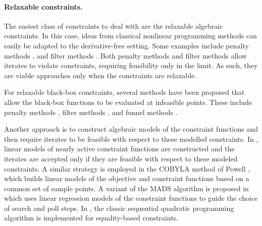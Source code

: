\documentclass{article}
\begin{document}
\paragraph*{Relaxable constraints.}   The easiest class of constraints to deal with are the relaxable algebraic constraints.   In this case, ideas from classical nonlinear programming methods can easily be adapted to the derivative-free setting.  Some examples include 
 penalty methods \cite{lewis.torczon:globally, lewis.torczon:direct, bueno.friedlander.ea:inexact},   and filter methods \cite{brekelmans.driessen.ea:constrained, ferreira.karas.ea:global}.     
Both penalty methods and filter methods allow iterates to violate constraints, requiring feasibility only in the limit.  As such, they are viable approaches only when the constraints are relaxable.    
 
For relaxable black-box constraints,  several methods have been proposed that allow the black-box functions to be evaluated at infeasible points.  These include penalty methods
\cite{audet.dennis:progressive, liuzzi.lucidi:derivative-free, liuzzi.lucidi.ea:sequential,fasano.liuzzi.ea:linesearch,diniz-ehrhardt.martinez.ea:derivative-free,picheny2016bayesian}, filter methods \cite{audet.dennis:pattern, pourmohamad:combining,echebest.schuverdt.ea:inexact},  and funnel methods \cite{sampaio.toint:derivative-free,sampaio.toint:numerical}.

Another approach is to construct algebraic models of the constraint functions and then require iterates to be feasible with respect to these modelled constraints.
In \cite{glass.cooper:sequential},  linear models of nearly active constraint functions are constructed and the iterates are accepted only if they are feasible with respect to these modeled constraints.     A similar strategy is employed in the COBYLA method of Powell \cite{powell:direct}, which builds linear models of the objective and constraint functions based on a common set of sample points.    
A variant of the MADS algorithm is proposed in \cite{burmen.olensek.ea:mesh} which uses linear regression models of the constraint functions to guide the choice of search and poll steps.   In \cite{Troltzsch2016},  the classic sequential quadratic programming algorithm is implemented for equality-based constraints.




\end{document}
